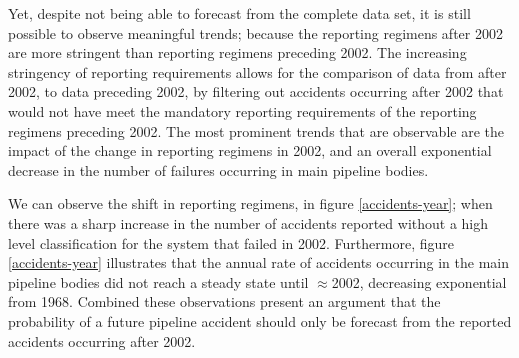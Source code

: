 \documentclass[letterpaper,10pt,oneside,final,onecolumn]{article}
\begin{document}
	Yet, despite not being able to forecast from the complete data set, it is still possible to observe meaningful trends; because the reporting regimens after 2002 are more stringent than reporting regimens preceding 2002.
	The increasing stringency of reporting requirements allows for the comparison of data from after 2002, to data preceding 2002, by filtering out accidents occurring after 2002 that would not have meet the mandatory reporting requirements of the reporting regimens preceding 2002.
	The most prominent trends that are observable are the impact of the change in reporting regimens in 2002, and an overall exponential decrease in the number of failures occurring in main pipeline bodies.

	We can observe the shift in reporting regimens, in figure \ref{accidents-year}; when there was a sharp increase in the number of accidents reported without a high level classification for the system that failed in 2002.
	Furthermore, figure \ref{accidents-year} illustrates that the annual rate of accidents occurring in the main pipeline bodies did not reach a steady state until $\approx$2002, decreasing exponential from 1968.
	Combined these observations present an argument that the probability of a future pipeline accident should only be forecast from the reported accidents occurring after 2002.
\end{document}
